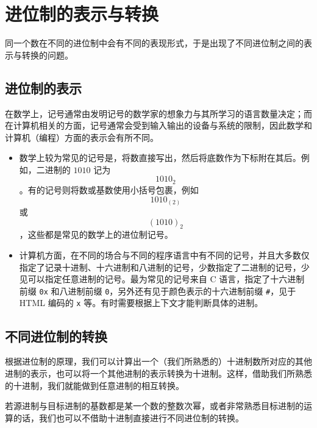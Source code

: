 \section{进位制的表示与转换}\label{sec:ArithBasics/positional-notation-presentation-and-conversion}
    同一个数在不同的进位制中会有不同的表现形式，于是出现了不同进位制之间的表示与转换的问题。
    \subsection{进位制的表示}\label{subsec:ArithBasics/positional-notation-presentation-and-conversion/presentation}
        在数学上，记号通常由发明记号的数学家的想象力与其所学习的语言数量决定；而在计算机相关的方面，记号通常会受到输入输出的设备与系统的限制，因此数学和计算机（编程）方面的表示会有所不同。
        \begin{itemize}
            \item 数学上较为常见的记号是，将数直接写出，然后将底数作为下标附在其后。例如，二进制的 $1010$ 记为\[1010_2\]。有的记号则将数或基数使用小括号包裹，例如\[1010_{(2)}\]或\[(1010)_2\]，这些都是常见的数学上的进位制记号。
            \item 计算机方面，在不同的场合与不同的程序语言中有不同的记号，并且大多数仅指定了记录十进制、十六进制和八进制的记号，少数指定了二进制的记号，少见可以指定任意进制的记号。最为常见的记号来自 C 语言，指定了十六进制前缀 \texttt{0x} 和八进制前缀 \texttt{0}，另外还有见于颜色表示的十六进制前缀 \texttt{\#}，见于 HTML 编码的 \texttt{x} 等。有时需要根据上下文才能判断具体的进制。
        \end{itemize}
    \subsection{不同进位制的转换}\label{subsec:ArithBasics/positional-notation-presentation-and-conversion/conversion}
        根据进位制的原理，我们可以计算出一个（我们所熟悉的）十进制数所对应的其他进制的表示，也可以将一个其他进制的表示转换为十进制。这样，借助我们所熟悉的十进制，我们就能做到任意进制的相互转换。

        若源进制与目标进制的基数都是某一个数的整数次幂，或者非常熟悉目标进制的运算的话，我们也可以不借助十进制直接进行不同进位制的转换。

